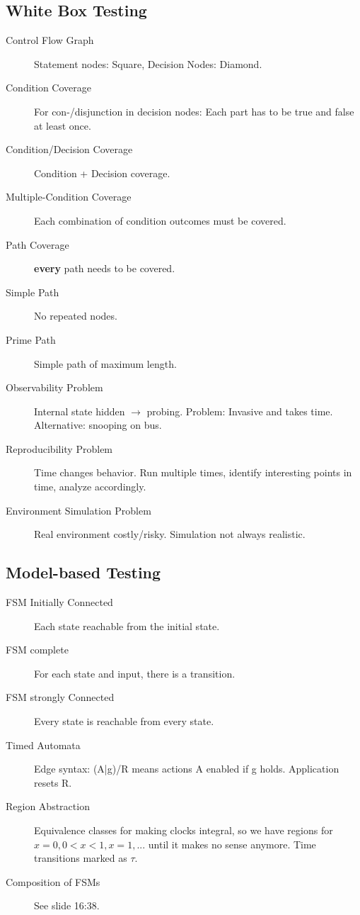 \subsection*{White Box Testing}
\begin{description}
	\item[Control Flow Graph] Statement nodes: Square, Decision Nodes: Diamond.
	\item[Condition Coverage] For con-/disjunction in decision nodes: Each
	part has to be true and false at least once.
	\item[Condition/Decision Coverage] Condition + Decision coverage.
	\item[Multiple-Condition Coverage] Each combination of condition outcomes must
	be covered.
	\item[Path Coverage] \textbf{every} path needs to be covered.
	\item[Simple Path] No repeated nodes.
	\item[Prime Path] Simple path of maximum length.
	\item[Observability Problem] Internal state hidden $\rightarrow$ probing.
	Problem: Invasive and takes time. Alternative: snooping on bus.
	\item[Reproducibility Problem] Time changes behavior. Run multiple times,
	identify interesting points in time, analyze accordingly.
	\item[Environment Simulation Problem] Real environment costly/risky. Simulation
	not always realistic.
\end{description}

\subsection*{Model-based Testing}
\begin{description}
	\item[FSM Initially Connected] Each state reachable from the initial state.
	\item[FSM complete] For each state and input, there is a transition.
	\item[FSM strongly Connected] Every state is reachable from every state.
	\item[Timed Automata] Edge syntax: (A|g)/R means actions A enabled if g holds.
	Application resets R.
	\item[Region Abstraction] Equivalence classes for making clocks integral, so we
	have regions for $x = 0, 0 < x < 1, x = 1, ...$ until it makes no sense
	anymore. Time transitions marked as $\tau$.
	\item[Composition of FSMs] See slide 16:38.
\end{description}

